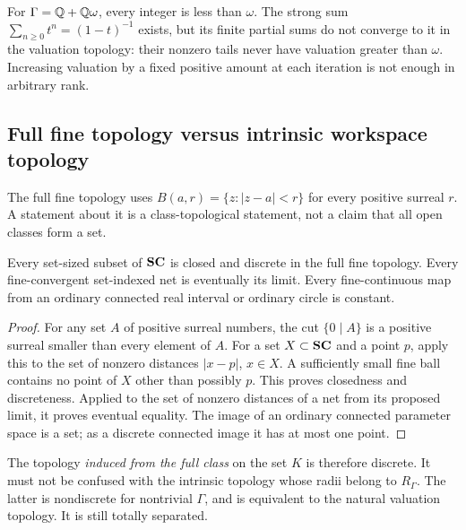 \documentclass[11pt,letterpaper]{article}
\theoremstyle{definition}
\theoremstyle{remark}
\numberwithin{equation}{section}
\begin{document}
\begin{example}\label{ex:rank}
For $\Gamma=\mathbb Q+\mathbb Q\omega$, every integer is less than $\omega$. The strong sum $\sum_{n\ge0}t^n=(1-t)^{-1}$ exists, but its finite partial sums do not converge to it in the valuation topology: their nonzero tails never have valuation greater than $\omega$. Increasing valuation by a fixed positive amount at each iteration is not enough in arbitrary rank.
\end{example}

\subsection{Full fine topology versus intrinsic workspace topology}
The full fine topology uses $B(a,r)=\{z:|z-a|<r\}$ for every positive surreal $r$. A statement about it is a class-topological statement, not a claim that all open classes form a set.

\begin{proposition}\label{prop:fine}
Every set-sized subset of $\mathbf{SC}$ is closed and discrete in the full fine topology. Every fine-convergent set-indexed net is eventually its limit. Every fine-continuous map from an ordinary connected real interval or ordinary circle is constant.
\end{proposition}
\begin{proof}
For any set $A$ of positive surreal numbers, the cut $\{0\mid A\}$ is a positive surreal smaller than every element of $A$. For a set $X\subset\mathbf{SC}$ and a point $p$, apply this to the set of nonzero distances $|x-p|$, $x\in X$. A sufficiently small fine ball contains no point of $X$ other than possibly $p$. This proves closedness and discreteness. Applied to the set of nonzero distances of a net from its proposed limit, it proves eventual equality. The image of an ordinary connected parameter space is a set; as a discrete connected image it has at most one point.
\end{proof}

The topology \emph{induced from the full class} on the set $K$ is therefore discrete. It must not be confused with the intrinsic topology whose radii belong to $R_\Gamma$. The latter is nondiscrete for nontrivial $\Gamma$, and is equivalent to the natural valuation topology. It is still totally separated.
\end{document}

